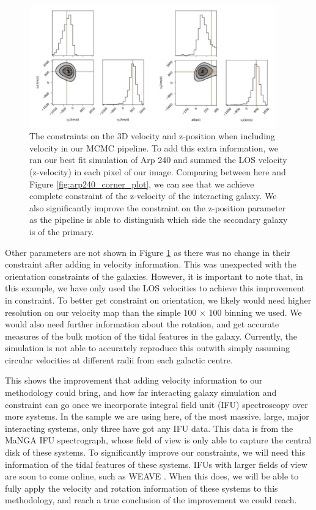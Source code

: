 \begin{figure}
    \centering
    \includegraphics[width=0.95\textwidth]{Chapter1/figures/vel-red-corner.pdf}
    \caption{The constraints on the 3D velocity and z-position when including velocity in our MCMC pipeline. To add this extra information, we ran our best fit simulation of Arp 240 and summed the LOS velocity (z-velocity) in each pixel of our image. Comparing between here and Figure \ref{fig:arp240_corner_plot}, we can see that we achieve complete constraint of the z-velocity of the interacting galaxy. We also significantly improve the constraint on the z-position parameter as the pipeline is able to distinguish which side the secondary galaxy is of the primary.}
    \label{fig:velocity_corner_plot}
\end{figure}

Other parameters are not shown in Figure \ref{fig:velocity_corner_plot} as there was no change in their constraint after adding in velocity information. This was unexpected with the orientation constraints of the galaxies. However, it is important to note that, in this example, we have only used the LOS velocities to achieve this improvement in constraint. To better get constraint on orientation, we likely would need higher resolution on our velocity map than the simple 100 $\times$ 100 binning we used. We would also need further information about the rotation, and get accurate measures of the bulk motion of the tidal features in the galaxy. Currently, the simulation is not able to accurately reproduce this outwith simply assuming circular velocities at different radii from each galactic centre. 

This shows the improvement that adding velocity information to our methodology could bring, and how far interacting galaxy simulation and constraint can go once we incorporate integral field unit (IFU) spectroscopy over more systems. In the sample we are using here, of the most massive, large, major interacting systems, only three have got any IFU data. This data is from the MaNGA \citep{2015ApJ...798....7B} IFU spectrograph, whose field of view is only able to capture the central disk of these systems. To significantly improve our constraints, we will need this information of the tidal features of these systems. IFUs with larger fields of view are soon to come online, such as WEAVE \citep{2014SPIE.9147E..0LD}. When this does, we will be able to fully apply the velocity and rotation information of these systems to this methodology, and reach a true conclusion of the improvement we could reach.

